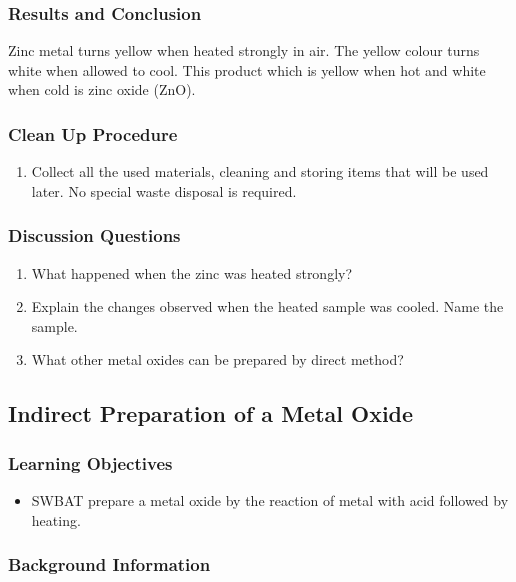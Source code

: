 \subsubsection*{Results and Conclusion}
Zinc metal turns yellow when heated strongly in air. The yellow colour turns white when allowed to cool. This product which is yellow when hot and white when cold is zinc oxide (ZnO).

\subsubsection*{Clean Up Procedure}
\begin{enumerate}
\item{Collect all the used materials, cleaning and storing items that will be used later. No special waste disposal is required.}
\end{enumerate}

\subsubsection*{Discussion Questions}
\begin{enumerate}
\item{What happened when the zinc was heated strongly?}
\item{Explain the changes observed when the heated sample was cooled. Name the sample.}
\item{What other metal oxides can be prepared by direct method?}
\end{enumerate}

\subsection{Indirect Preparation of a Metal Oxide}

\subsubsection*{Learning Objectives}
\begin{itemize}
\item{SWBAT prepare a metal oxide by the reaction of metal with acid followed by heating.}
\end{itemize}

\subsubsection*{Background Information}


